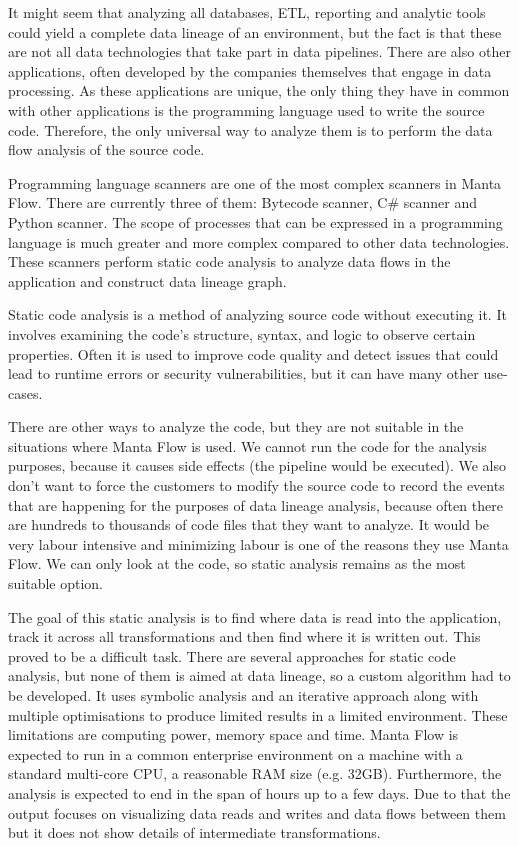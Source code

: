 It might seem that analyzing all databases, ETL, reporting and analytic tools could yield a complete data lineage of an environment, but the fact is that these are not all data technologies that take part in data pipelines. There are also other applications, often developed by the companies themselves that engage in data processing. As these applications are unique, the only thing they have in common with other applications is the programming language used to write the source code. Therefore, the only universal way to analyze them is to perform the data flow analysis of the source code.
\par
Programming language scanners are one of the most complex scanners in Manta Flow. There are currently three of them: Bytecode scanner, C\# scanner and Python scanner. The scope of processes that can be expressed in a programming language is much greater and more complex compared to other data technologies. These scanners perform static code analysis to analyze data flows in the application and construct data lineage graph.
\par
Static code analysis is a method of analyzing source code without executing it. It involves examining the code's structure, syntax, and logic to observe certain properties. Often it is used to improve code quality and detect issues that could lead to runtime errors or security vulnerabilities, but it can have many other use-cases.
\par
There are other ways to analyze the code, but they are not suitable in the situations where Manta Flow is used. We cannot run the code for the analysis purposes, because it causes side effects (the pipeline would be executed). We also don't want to force the customers to modify the source code to record the events that are happening for the purposes of data lineage analysis, because often there are hundreds to thousands of code files that they want to analyze. It would be very labour intensive and minimizing labour is one of the reasons they use Manta Flow. We can only look at the code, so static analysis remains as the most suitable option.
\par
The goal of this static analysis is to find where data is read into the application, track it across all transformations and then find where it is written out. This proved to be a difficult task. There are several approaches for static code analysis, but none of them is aimed at data lineage, so a custom algorithm had to be developed. It uses symbolic analysis and an iterative approach along with multiple optimisations to produce limited results in a limited environment. These limitations are computing power, memory space and time. Manta Flow is expected to run in a common enterprise environment on a machine with a standard multi-core CPU, a reasonable RAM size (e.g. 32GB). Furthermore, the analysis is expected to end in the span of hours up to a few days. Due to that the output focuses on visualizing data reads and writes and data flows between them but it does not show details of intermediate transformations.

